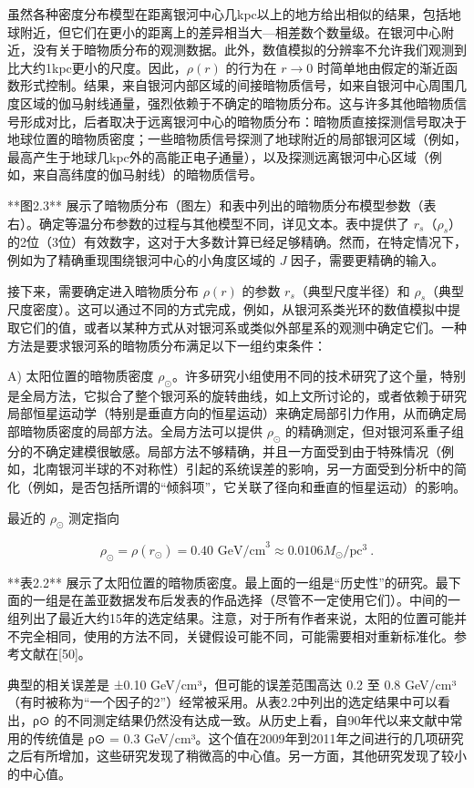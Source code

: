 虽然各种密度分布模型在距离银河中心几kpc以上的地方给出相似的结果，包括地球附近，但它们在更小的距离上的差异相当大—相差数个数量级。在银河中心附近，没有关于暗物质分布的观测数据。此外，数值模拟的分辨率不允许我们观测到比大约1kpc更小的尺度。因此，\( \rho(r) \) 的行为在 \( r \to 0 \) 时简单地由假定的渐近函数形式控制。结果，来自银河内部区域的间接暗物质信号，如来自银河中心周围几度区域的伽马射线通量，强烈依赖于不确定的暗物质分布。这与许多其他暗物质信号形成对比，后者取决于远离银河中心的暗物质分布：暗物质直接探测信号取决于地球位置的暗物质密度；一些暗物质信号探测了地球附近的局部银河区域（例如，最高产生于地球几kpc外的高能正电子通量），以及探测远离银河中心区域（例如，来自高纬度的伽马射线）的暗物质信号。

**图2.3** 展示了暗物质分布（图左）和表中列出的暗物质分布模型参数（表右）。确定等温分布参数的过程与其他模型不同，详见文本。表中提供了 \( r_s \)（\( \rho_s \)）的2位（3位）有效数字，这对于大多数计算已经足够精确。然而，在特定情况下，例如为了精确重现围绕银河中心的小角度区域的 \( J \) 因子，需要更精确的输入。

接下来，需要确定进入暗物质分布 \( \rho(r) \) 的参数 \( r_s \)（典型尺度半径）和 \( \rho_s \)（典型尺度密度）。这可以通过不同的方式完成，例如，从银河系类光环的数值模拟中提取它们的值，或者以某种方式从对银河系或类似外部星系的观测中确定它们。一种方法是要求银河系的暗物质分布满足以下一组约束条件：

A) 太阳位置的暗物质密度 \( \rho_\odot \)。许多研究小组使用不同的技术研究了这个量，特别是全局方法，它拟合了整个银河系的旋转曲线，如上文所讨论的，或者依赖于研究局部恒星运动学（特别是垂直方向的恒星运动）来确定局部引力作用，从而确定局部暗物质密度的局部方法。全局方法可以提供 \( \rho_\odot \) 的精确测定，但对银河系重子组分的不确定建模很敏感。局部方法不够精确，并且一方面受到由于特殊情况（例如，北南银河半球的不对称性）引起的系统误差的影响，另一方面受到分析中的简化（例如，是否包括所谓的“倾斜项”，它关联了径向和垂直的恒星运动）的影响。

最近的 \( \rho_\odot \) 测定指向

\[ \rho_\odot = \rho(r_\odot) = 0.40 \text{ GeV/cm}^3 \approx 0.0106 M_\odot/\text{pc}^3 ~. \]

**表2.2** 展示了太阳位置的暗物质密度。最上面的一组是“历史性”的研究。最下面的一组是在盖亚数据发布后发表的作品选择（尽管不一定使用它们）。中间的一组列出了最近大约15年的选定结果。注意，对于所有作者来说，太阳的位置可能并不完全相同，使用的方法不同，关键假设可能不同，可能需要相对重新标准化。参考文献在[50]。

典型的相关误差是 ±0.10 GeV/cm³，但可能的误差范围高达 0.2 至 0.8 GeV/cm³（有时被称为“一个因子的2”）经常被采用。从表2.2中列出的选定结果中可以看出，ρ⊙ 的不同测定结果仍然没有达成一致。从历史上看，自90年代以来文献中常用的传统值是 ρ⊙ = 0.3 GeV/cm³。这个值在2009年到2011年之间进行的几项研究之后有所增加，这些研究发现了稍微高的中心值。另一方面，其他研究发现了较小的中心值。

